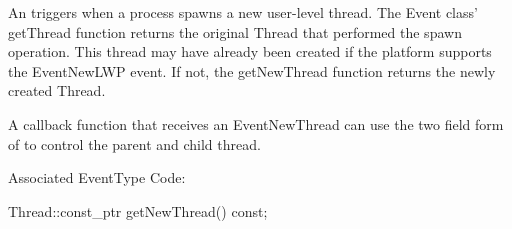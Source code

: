 
An  triggers when a process spawns a new user-level
thread.
The Event class' getThread function returns the original Thread that performed
the spawn operation. This thread may have already been created if the platform
supports the EventNewLWP event. If not, the getNewThread function returns the
newly created Thread.

A callback function that receives an EventNewThread can use the two field form
of   to control the parent and child thread.

Associated EventType Code: 

\begin{apient}
Thread::const_ptr getNewThread() const;
\end{apient}

